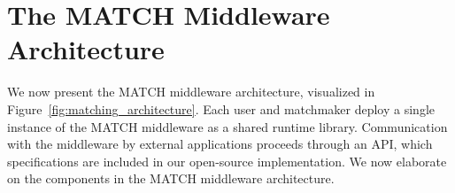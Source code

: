 



\section{The MATCH Middleware Architecture}
\label{sec:architecture}
We now present the MATCH middleware architecture, visualized in Figure~\ref{fig:matching_architecture}.
Each user and matchmaker deploy a single instance of the MATCH middleware as a shared runtime library.
Communication with the middleware by external applications proceeds through an API, which specifications are included in our open-source implementation.
We now elaborate on the components in the MATCH middleware architecture.

